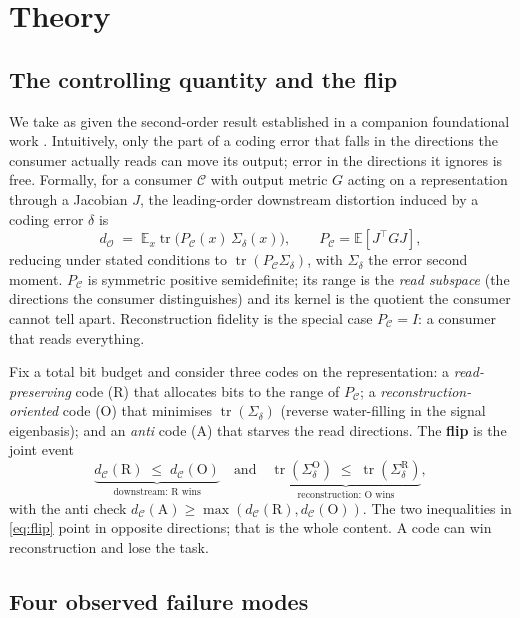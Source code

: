 \documentclass[10pt]{article} %
\theoremstyle{remark}
\newcommand{\PC}{P_{\mathcal{C}}}
\newcommand{\Sd}{\Sigma_{\delta}}
\newcommand{\tr}{\operatorname{tr}}
\newcommand{\dO}{d_{\mathcal{O}}}
\newcommand{\E}{\mathbb{E}}
\begin{document}
\section{Theory}\label{sec:theory}

\subsection{The controlling quantity and the flip}

We take as given the second-order result established in a companion foundational work
\citep{anon-cost}. Intuitively, only the part of a coding error that falls in the
directions the consumer actually reads can move its output; error in the directions it
ignores is free. Formally, for a consumer $\mathcal{C}$ with output metric $G$ acting on a
representation through a Jacobian $J$, the leading-order downstream distortion induced by
a coding error $\delta$ is
\begin{equation}\label{eq:do}
\dO \;=\; \E_x \tr\!\big(\PC(x)\,\Sd(x)\big),\qquad \PC=\E[J^\top G J],
\end{equation}
reducing under stated conditions to $\tr(\PC\Sd)$, with $\Sd$ the error second moment.
$\PC$ is symmetric positive semidefinite; its range is the \emph{read subspace} (the
directions the consumer distinguishes) and its kernel is the quotient the consumer cannot
tell apart. Reconstruction fidelity is the special case $\PC=I$: a consumer that reads
everything.

Fix a total bit budget and consider three codes on the representation:
a \emph{read-preserving} code (R) that allocates bits to the range of $\PC$; a
\emph{reconstruction-oriented} code (O) that minimises $\tr(\Sd)$ (reverse water-filling
\citep{cover2006} in the signal eigenbasis); and an \emph{anti} code (A) that starves the
read directions.
The \textbf{flip} is the joint event
\begin{equation}\label{eq:flip}
\underbrace{d_{\mathcal C}(\text{R}) \;\le\; d_{\mathcal C}(\text{O})}_{\text{downstream: R wins}}
\quad\text{and}\quad
\underbrace{\tr(\Sd^{\text{O}}) \;\le\; \tr(\Sd^{\text{R}})}_{\text{reconstruction: O wins}} ,
\end{equation}
with the anti check $d_{\mathcal C}(\text{A}) \ge \max(d_{\mathcal C}(\text{R}),
d_{\mathcal C}(\text{O}))$. The two inequalities in \eqref{eq:flip} point in opposite
directions; that is the whole content. A code can win reconstruction and lose the task.

\subsection{Four observed failure modes}\label{sec:taxonomy}
\end{document}
